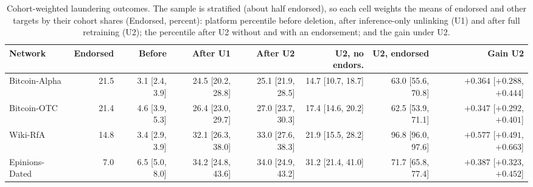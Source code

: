 \begin{table}[!t]
\centering
\scriptsize
\setlength{\tabcolsep}{3pt}
\caption{Cohort-weighted laundering outcomes. The sample is stratified (about half endorsed), so each cell weights the means of endorsed and other targets by their cohort shares (Endorsed, percent): platform percentile before deletion, after inference-only unlinking (U1) and after full retraining (U2); the percentile after U2 without and with an endorsement; and the gain under U2.}
\label{tab:s_s_percentiles_cohort}
\begin{tabular}{@{}lrrrrrrr@{}}
\toprule
\textbf{Network} & \textbf{Endorsed} & \textbf{Before} & \textbf{After U1} & \textbf{After U2} & \textbf{U2, no endors.} & \textbf{U2, endorsed} & \textbf{Gain U2} \\
\midrule
Bitcoin-Alpha & 21.5 & 3.1 [2.4, 3.9] & 24.5 [20.2, 28.8] & 25.1 [21.9, 28.5] & 14.7 [10.7, 18.7] & 63.0 [55.6, 70.8] & $+0.364$ [$+0.288$, $+0.444$] \\
Bitcoin-OTC & 21.4 & 4.6 [3.9, 5.3] & 26.4 [23.0, 29.7] & 27.0 [23.7, 30.3] & 17.4 [14.6, 20.2] & 62.5 [53.9, 71.1] & $+0.347$ [$+0.292$, $+0.401$] \\
Wiki-RfA & 14.8 & 3.4 [2.9, 3.9] & 32.1 [26.3, 38.0] & 33.0 [27.6, 38.3] & 21.9 [15.5, 28.2] & 96.8 [96.0, 97.6] & $+0.577$ [$+0.491$, $+0.663$] \\
Epinions-Dated & 7.0 & 6.5 [5.0, 8.0] & 34.2 [24.8, 43.6] & 34.0 [24.9, 43.2] & 31.2 [21.4, 41.0] & 71.7 [65.8, 77.4] & $+0.387$ [$+0.323$, $+0.452$] \\
\bottomrule
\end{tabular}
\end{table}

